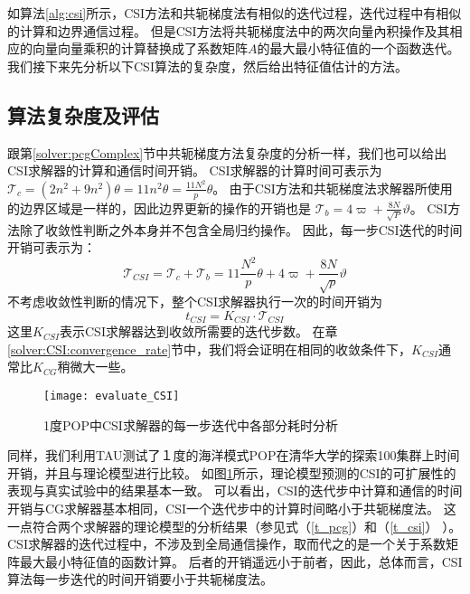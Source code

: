 如算法\ref{alg:csi}所示，CSI方法和共轭梯度法有相似的迭代过程，迭代过程中有相似的计算和边界通信过程。
但是CSI方法将共轭梯度法中的两次向量內积操作及其相应的向量向量乘积的计算替换成了系数矩阵$A$的最大最小特征值的一个函数迭代。 我们接下来先分析以下CSI算法的复杂度，然后给出特征值估计的方法。

\subsection{算法复杂度及评估} \label{solver:Algorithm:complex}

跟第\ref{solver:pcgComplex}节中共轭梯度方法复杂度的分析一样，我们也可以给出CSI求解器的计算和通信时间开销。
CSI求解器的计算时间可表示为
$\mathcal{T}_c =  (2 n^2 + 9n^2)\theta = 11n^2\theta =\frac{11N^2}{p}\theta$。 
由于CSI方法和共轭梯度法求解器所使用的边界区域是一样的，因此边界更新的操作的开销也是 $\mathcal{T}_b =4\varpi + \frac{8N}{\sqrt{P}}\vartheta$。 CSI方法除了收敛性判断之外本身并不包含全局归约操作。 
因此，每一步CSI迭代的时间开销可表示为： 　
\begin{equation}
\label{t_csi}
\mathcal{T}_{CSI} = \mathcal{T}_c + \mathcal{T}_b
= 11\frac{N^2}{p}\theta + 4\varpi + \frac{8N}{\sqrt{p}}\vartheta
\end{equation}
不考虑收敛性判断的情况下，整个CSI求解器执行一次的时间开销为
\begin{equation}
\label{t_csi_all}
t_{CSI} = K_{CSI}\cdot \mathcal{T}_{CSI}
\end{equation}
这里$K_{CSI}$表示CSI求解器达到收敛所需要的迭代步数。
在章\ref{solver:CSI:convergence_rate}节中，我们将会证明在相同的收敛条件下，$K_{CSI}$通常比$K_{CG}$稍微大一些。



\begin {figure}%
\centering
\texttt{[image: evaluate\_CSI]}
\caption[] { 1度POP中CSI求解器的每一步迭代中各部分耗时分析}
\label{fig:cst_ratio}
\end{figure}
同样，我们利用TAU测试了１度的海洋模式POP在清华大学的探索100集群上时间开销，并且与理论模型进行比较。
如图\ref{fig:cst_ratio}所示，理论模型预测的CSI的可扩展性的表现与真实试验中的结果基本一致。
可以看出，CSI的迭代步中计算和通信的时间开销与CG求解器基本相同，CSI一个迭代步中的计算时间略小于共轭梯度法。
这一点符合两个求解器的理论模型的分析结果（参见式（\ref{t_pcg}）和（\ref{t_csi}） ）。
CSI求解器的迭代过程中，不涉及到全局通信操作，取而代之的是一个关于系数矩阵最大最小特征值的函数计算。
后者的开销遥远小于前者，因此，总体而言，CSI算法每一步迭代的时间开销要小于共轭梯度法。 

